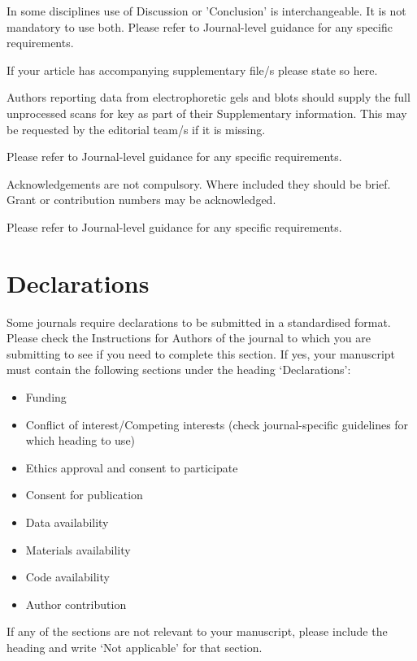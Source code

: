 \documentclass[pdflatex,sn-mathphys-num]{sn-jnl}%
\theoremstyle{thmstyleone}%
\theoremstyle{thmstyletwo}%
\theoremstyle{thmstylethree}%
\begin{document}
In some disciplines use of Discussion or 'Conclusion' is interchangeable. It is not mandatory to use both. Please refer to Journal-level guidance for any specific requirements. 

\backmatter


If your article has accompanying supplementary file/s please state so here. 

Authors reporting data from electrophoretic gels and blots should supply the full unprocessed scans for key as part of their Supplementary information. This may be requested by the editorial team/s if it is missing.

Please refer to Journal-level guidance for any specific requirements.


Acknowledgements are not compulsory. Where included they should be brief. Grant or contribution numbers may be acknowledged.

Please refer to Journal-level guidance for any specific requirements.

\section*{Declarations}

Some journals require declarations to be submitted in a standardised format. Please check the Instructions for Authors of the journal to which you are submitting to see if you need to complete this section. If yes, your manuscript must contain the following sections under the heading `Declarations':

\begin{itemize}
\item Funding
\item Conflict of interest/Competing interests (check journal-specific guidelines for which heading to use)
\item Ethics approval and consent to participate
\item Consent for publication
\item Data availability 
\item Materials availability
\item Code availability 
\item Author contribution
\end{itemize}

\noindent
If any of the sections are not relevant to your manuscript, please include the heading and write `Not applicable' for that section. 
\end{document}
